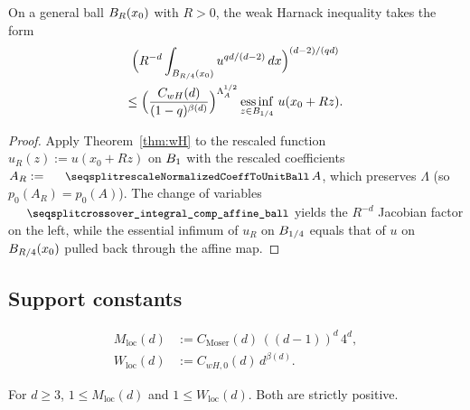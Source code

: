 \begin{theorem}
\label{thm:wH-on-ball}
\leanok
{}
On a general ball $B_{R}(x_0)$ with $R > 0$, the weak Harnack inequality
takes the form
\begin{multline*}
  \Bigl(R^{-d}\int_{B_{R/4}(x_0)} u^{qd/(d-2)}\,dx\Bigr)^{(d-2)/(qd)}\\
   \leq \Bigl(\frac{C_{wH}(d)}{(1-q)^{\beta(d)}}\Bigr)^{\Lambda_A^{1/2}}
        \operatorname*{ess\,inf}_{z \in B_{1/4}}\, u(x_0 + R z).
\end{multline*}
\end{theorem}

\begin{proof}
\leanok
{}

Apply Theorem~\ref{thm:wH} to the rescaled function
$u_R(z) := u(x_0 + R z)$ on $B_{1}$ with the rescaled coefficients
$A_R := \leanname{rescaleNormalizedCoeffToUnitBall}\,A$, which preserves
$\Lambda$ (so $p_0(A_R) = p_0(A)$). The change of variables
$\leanname{crossover\_integral\_comp\_affine\_ball}$ yields the
$R^{-d}$ Jacobian factor on the left, while the essential infimum of $u_R$
on $B_{1/4}$ equals that of $u$ on $B_{R/4}(x_0)$ pulled back through the
affine map.
\end{proof}

\subsection{Support constants}

\begin{definition}
\label{def:local-bases}
\leanok
{}
\begin{align*}
  M_{\mathrm{loc}}(d) &:= C_{\mathrm{Moser}}(d)\,((d-1))^d\,4^d, \\
  W_{\mathrm{loc}}(d) &:= C_{wH,0}(d)\, d^{\beta(d)}.
\end{align*}
\end{definition}

\begin{lemma}
\label{lem:one_le_localMoserBase}
\leanok
{}
For $d \geq 3$, $1 \leq M_{\mathrm{loc}}(d)$ and $1 \leq W_{\mathrm{loc}}(d)$.
Both are strictly positive.
\end{lemma}

